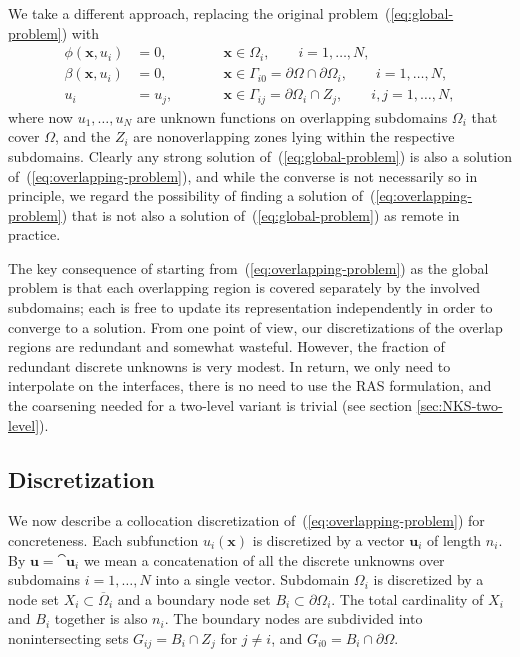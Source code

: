 We take a different approach, replacing the original problem~(\ref{eq:global-problem}) with
\begin{subequations}
  \label{eq:overlapping-problem}
  \begin{alignat}{2}
    \label{eq:local-pde}
    \phi(\bm{x},u_i) &= 0, & \qquad & \bm{x}\in\Omega_i, \qquad i=1,\ldots,N,\\
    \label{eq:local-bc}
    \beta(\bm{x},u_i) &= 0, & \qquad & \bm{x}\in \Gamma_{i0}= \partial\Omega \cap \partial\Omega_i, \qquad i=1,\ldots,N,\\
    \label{eq:local-match}
    u_i & = u_j, & \qquad & \bm{x}\in\Gamma_{ij}= \partial\Omega_i \cap Z_j, \qquad i,j=1,\ldots,N,
  \end{alignat}  
\end{subequations}
where now $u_1,\ldots,u_N$ are unknown functions on overlapping subdomains $\Omega_i$ that cover $\Omega$, and the $Z_i$ are nonoverlapping zones lying within the respective subdomains. Clearly any strong solution of~(\ref{eq:global-problem}) is also a solution of~(\ref{eq:overlapping-problem}), and while the converse is not necessarily so in principle,   we regard the possibility of finding a solution of~(\ref{eq:overlapping-problem}) that is not also a solution of~(\ref{eq:global-problem}) as remote in practice.

The key consequence of starting from~(\ref{eq:overlapping-problem}) as the global problem is that each overlapping region is covered separately by the involved subdomains; each is free to update its representation independently in order to converge to a solution. From one point of view, our discretizations of the overlap regions are redundant and somewhat wasteful. However, the fraction of redundant discrete unknowns is very modest. In return, we only need to interpolate on the interfaces, there is no need to use the RAS formulation, and the coarsening needed for a two-level variant is trivial (see section \ref{sec:NKS-two-level}).

\subsection{Discretization}

\label{sec:discretization}

We now describe a collocation discretization of~(\ref{eq:overlapping-problem}) for concreteness. Each subfunction $u_i(\bm{x})$ is discretized by a vector $\bm{u}_i$ of length $n_i$. By $\bm{u}=\cat{\bm{u}_i}$ we mean a concatenation of all the discrete unknowns over subdomains $i=1,\ldots,N$ into a single vector. Subdomain $\Omega_i$ is discretized by a node set $X_i\subset \overline{\Omega}_i$ and a boundary node set $B_i \subset \partial\Omega_i$. The total cardinality of $X_i$ and $B_i$ together is also $n_i$. The boundary nodes are subdivided into nonintersecting sets $G_{ij}=B_i\cap Z_j$ for $j\neq i$, and $G_{i0}= B_i \cap \partial\Omega$.

